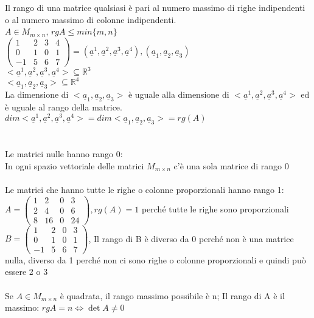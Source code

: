 Il rango di una matrice qualsiasi è pari al numero massimo di righe indipendenti o al numero massimo di colonne indipendenti.\\
$A\in M_{m\times n}$, $rgA\leqslant min\{m,n\}$\\
$\begin{pmatrix}
	1 & 2 & 3 & 4\\
	0 & 1 & 0 & 1\\
	-1 & 5 & 6 & 7
\end{pmatrix}=(\underline{a}^1, \underline{a}^2, \underline{a}^3, \underline{a}^4), (\underline{a}_1,\underline{a}_2,\underline{a}_3)$\\
$<\underline{a}^1, \underline{a}^2, \underline{a}^3, \underline{a}^4>\subseteq\mathbb{R}^3$\\
$<\underline{a}_1,\underline{a}_2,\underline{a}_3>\subseteq\mathbb{R}^4$\\
La dimensione di $<\underline{a}_1,\underline{a}_2,\underline{a}_3>$ è uguale alla dimensione di $<\underline{a}^1, \underline{a}^2, \underline{a}^3, \underline{a}^4>$ ed è uguale al rango della matrice.\\
$dim<\underline{a}^1, \underline{a}^2, \underline{a}^3, \underline{a}^4>=dim<\underline{a}_1,\underline{a}_2,\underline{a}_3>=rg(A)$\\\\\\
Le matrici nulle hanno rango 0:\\
In ogni spazio vettoriale delle matrici $M_{m\times n}$ c'è una sola matrice di rango 0\\\\
Le matrici che hanno tutte le righe o colonne proporzionali hanno rango 1:
$A=\begin{pmatrix}
	1 & 2 & 0 & 3\\
	2 & 4 & 0 & 6\\
	8 & 16 & 0 & 24
\end{pmatrix}, rg(A)=1$ perché tutte le righe sono proporzionali\\
$B=\begin{pmatrix}
	1 & 2 & 0 & 3\\
	0 & 1 & 0 & 1\\
	-1 & 5 & 6 & 7
\end{pmatrix}$, Il rango di B è diverso da 0 perché non è una matrice nulla, diverso da 1 perché non ci sono righe o colonne proporzionali e quindi può essere 2 o 3\\\\
Se $A\in M_{m\times n}$ è quadrata, il rango massimo possibile è n; Il rango di A è il massimo: $rgA=n\Leftrightarrow \det A\neq 0$

